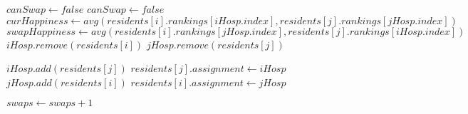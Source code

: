 \documentclass[letterpaper, 10pt,DIV=13]{scrartcl}
\numberwithin{equation}{section} %
\numberwithin{figure}{section} %
\numberwithin{table}{section} %
\begin{document}
\begin{algorithm}
\begin{algorithmic}[1]
                        \State $canSwap \gets false$ 
                        \State $canSwap \gets false$ 
                    \EndIf
                        \State $curHappiness \gets avg(residents[i].rankings[iHosp.index], residents[j].rankings[jHosp.index])$
                        \State $swapHappiness \gets avg(residents[i].rankings[jHosp.index], residents[j].rankings[iHosp.index])$
                         
                            \State $iHosp.remove(residents[i])$ 
                            \State $jHosp.remove(residents[j])$

                            \State $iHosp.add(residents[j])$ 
                            \State $residents[j].assignment \gets iHosp$
                            \State $jHosp.add(residents[i])$
                            \State $residents[i].assignment \gets jHosp$

                            \State $swaps \gets swaps + 1$ 
                        \EndIf
                    \EndIf
                \EndFor
            \EndFor
          \EndWhile
        \EndProcedure
    \end{algorithmic}
  \end{algorithm}
\end{document}
